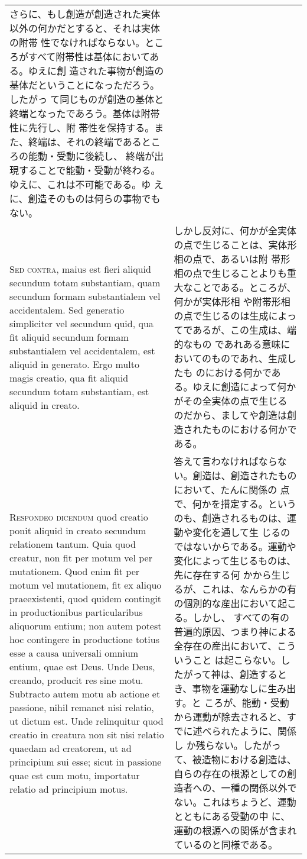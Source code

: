 \documentclass[10pt]{jsarticle} %
\begin{document}
\begin{longtable}{p{21em}p{21em}}
さらに、もし創造が創造された実体以外の何かだとすると、それは実体の附帯
 性でなければならない。ところがすべて附帯性は基体においてある。ゆえに創
 造された事物が創造の基体だということになっただろう。したがっ
 て同じものが創造の基体と終端となったであろう。基体は附帯性に先行し、附
 帯性を保持する。また、終端は、それの終端であるところの能動・受動に後続し、
 終端が出現することで能動・受動が終わる。ゆえに、これは不可能である。ゆ
 えに、創造そのものは何らの事物でもない。



\\

{\scshape Sed contra}, maius est fieri aliquid secundum totam substantiam, quam
 secundum formam substantialem vel accidentalem. Sed generatio
 simpliciter vel secundum quid, qua fit aliquid secundum formam
 substantialem vel accidentalem, est aliquid in generato. Ergo multo
 magis creatio, qua fit aliquid secundum totam substantiam, est aliquid
 in creato.

&

しかし反対に、何かが全実体の点で生じることは、実体形相の点で、あるいは附
 帯形相の点で生じることよりも重大なことである。ところが、何かが実体形相
 や附帯形相の点で生じるのは生成によってであるが、この生成は、端的なもの
 であれある意味においてのものであれ、生成したも
 のにおける何かである。ゆえに創造によって何かがその全実体の点で生じる
 のだから、ましてや創造は創造されたものにおける何かである。

\\

{\scshape Respondeo dicendum} quod creatio ponit aliquid in creato secundum
 relationem tantum. Quia quod creatur, non fit per motum vel per
 mutationem. Quod enim fit per motum vel mutationem, fit ex aliquo
 praeexistenti, quod quidem contingit in productionibus particularibus
 aliquorum entium; non autem potest hoc contingere in productione totius
 esse a causa universali omnium entium, quae est Deus. Unde Deus,
 creando, producit res sine motu. Subtracto autem motu ab actione et
 passione, nihil remanet nisi relatio, ut dictum est. Unde relinquitur
 quod creatio in creatura non sit nisi relatio quaedam ad creatorem, ut
 ad principium sui esse; sicut in passione quae est cum motu, importatur
 relatio ad principium motus.

&

答えて言わなければならない。創造は、創造されたものにおいて、たんに関係の
点で、何かを措定する。というのも、創造されるものは、運動や変化を通して生
じるのではないからである。運動や変化によって生じるものは、先に存在する何
かから生じるが、これは、なんらかの有の個別的な産出において起こる。しかし、
すべての有の普遍的原因、つまり神による全存在の産出において、こういうこと
は起こらない。したがって神は、創造するとき、事物を運動なしに生み出す。と
ころが、能動・受動から運動が除去されると、すでに述べられたように、関係し
か残らない。したがって、被造物における創造は、自らの存在の根源としての創
造者への、一種の関係以外でない。これはちょうど、運動とともにある受動の中
に、運動の根源への関係が含まれているのと同様である。



\end{longtable}
\end{document}
